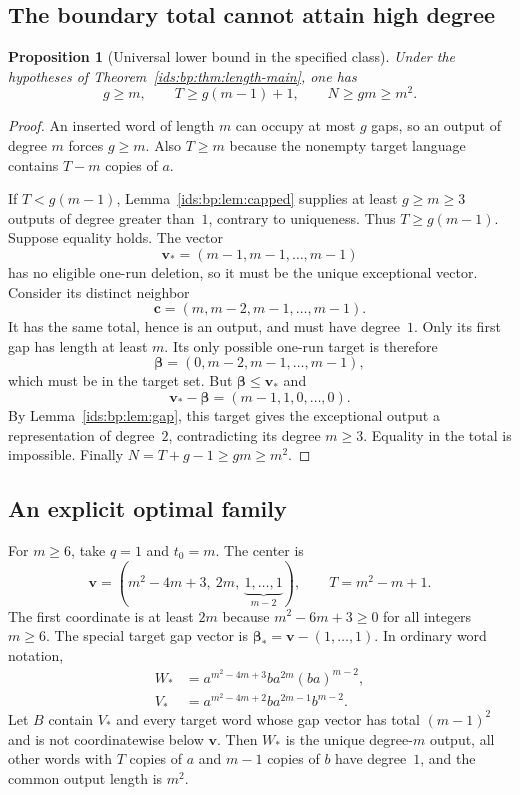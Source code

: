 \documentclass[11pt,letterpaper]{article}
\newtheorem{proposition}[theorem]{Proposition}
\theoremstyle{definition}\newtheorem{definition}[theorem]{Definition}
\theoremstyle{remark}\newtheorem{remark}[theorem]{Remark}
\theoremstyle{definition}\newtheorem{question}[theorem]{Question}
\begin{document}
\subsection{The boundary total cannot attain high degree}
\begin{proposition}[Universal lower bound in the specified class]
\label{ids:bp:prop:lower}
Under the hypotheses of Theorem~\ref{ids:bp:thm:length-main}, one has
\[
 g\geq m,\qquad T\geq g(m-1)+1,\qquad N\geq gm\geq m^2.
\]
\end{proposition}
\begin{proof}
An inserted word of length $m$ can occupy at most $g$ gaps, so an output of
degree $m$ forces $g\geq m$. Also $T\geq m$ because the nonempty target
language contains $T-m$ copies of $a$.

If $T<g(m-1)$, Lemma~\ref{ids:bp:lem:capped} supplies at least $g\geq m\geq3$
outputs of degree greater than~$1$, contrary to uniqueness. Thus
$T\geq g(m-1)$. Suppose equality holds. The vector
\[
 \mathbf v_*=(m-1,m-1,\ldots,m-1)
\]
has no eligible one-run deletion, so it must be the unique exceptional
vector. Consider its distinct neighbor
\[
 \mathbf c=(m,m-2,m-1,\ldots,m-1).
\]
It has the same total, hence is an output, and must have degree~$1$. Only
its first gap has length at least $m$. Its only possible one-run target is
therefore
\[
 \boldsymbol\beta=(0,m-2,m-1,\ldots,m-1),
\]
which must be in the target set. But $\boldsymbol\beta\leq\mathbf v_*$ and
\[
 \mathbf v_*-\boldsymbol\beta=(m-1,1,0,\ldots,0).
\]
By Lemma~\ref{ids:bp:lem:gap}, this target gives the exceptional output a
representation of degree~$2$, contradicting its degree $m\geq3$. Equality in
the total is impossible. Finally $N=T+g-1\geq gm\geq m^2$.
\end{proof}

\subsection{An explicit optimal family}
For $m\geq6$, take $q=1$ and $t_0=m$. The center is
\begin{equation}
 \mathbf v=(m^2-4m+3,\ 2m,\ \underbrace{1,\ldots,1}_{m-2}),
 \qquad T=m^2-m+1.
 \label{ids:bp:eq:optimal-center}
\end{equation}
The first coordinate is at least $2m$ because $m^2-6m+3\geq0$ for all
integers $m\geq6$. The special target gap vector is
$\boldsymbol\beta_* = \mathbf v-(1,\ldots,1)$. In ordinary word notation,
\begin{align}
 W_*&=a^{m^2-4m+3}b a^{2m}(ba)^{m-2},
                    \label{ids:bp:eq:optimal-word}\\
 V_*&=a^{m^2-4m+2}b a^{2m-1}b^{m-2}.
                    \label{ids:bp:eq:optimal-target}
\end{align}
Let $B$ contain $V_*$ and every target word whose gap vector has total
$(m-1)^2$ and is not coordinatewise below $\mathbf v$.
Then $W_*$ is the unique degree-$m$ output, all other words with $T$ copies
of $a$ and $m-1$ copies of $b$ have degree~$1$, and the common output length
is $m^2$.
\end{document}
